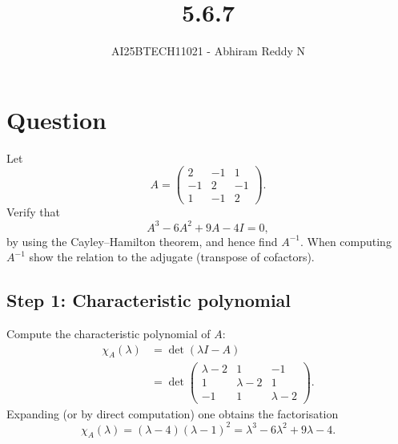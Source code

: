 \documentclass[journal]{IEEEtran}
\begin{document}

\vspace{3cm}

\title{5.6.7}
\author{AI25BTECH11021 - Abhiram Reddy N}
{\let\newpage\relax\maketitle}

\renewcommand{\thefigure}{\theenumi}
\renewcommand{\thetable}{\theenumi}
\setlength{\intextsep}{10pt} %


\renewcommand{\thetable}{\theenumi}


\section*{Question}
Let
\[
A=\begin{pmatrix}
2 & -1 & 1\\[4pt]
-1 & 2 & -1\\[4pt]
1 & -1 & 2
\end{pmatrix}.
\]
Verify that
\begin{equation}\label{eq:CH}
A^{3}-6A^{2}+9A-4I=0,
\end{equation}
by using the Cayley--Hamilton theorem, and hence find \(A^{-1}\). When computing \(A^{-1}\) show the relation to the adjugate (transpose of cofactors).

\subsection*{Step 1: Characteristic polynomial}
Compute the characteristic polynomial of \(A\):
\begin{align}
\chi_A(\lambda)&=\det(\lambda I - A)\nonumber\\
&=\det\begin{pmatrix}
\lambda-2 & 1 & -1\\[4pt]
1 & \lambda-2 & 1\\[4pt]
-1 & 1 & \lambda-2
\end{pmatrix}.\label{eq:char-det}
\end{align}
Expanding (or by direct computation) one obtains the factorisation
\begin{equation}\label{eq:char-factor}
\chi_A(\lambda)=(\lambda-4)(\lambda-1)^{2}
=\lambda^{3}-6\lambda^{2}+9\lambda-4.
\end{equation}
\end{document}
